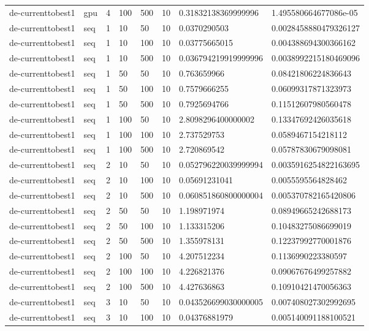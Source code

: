 \begin{table}[t]
\begin{tabular}{llllllll}
de-currenttobest1 & gpu & 4 & 100 & 500 & 10 & 0.31832138369999996 & 1.495580664677086e-05 \\
de-currenttobest1 & seq & 1 & 10 & 50 & 10 & 0.0370290503 & 0.0028458880479326127 \\
de-currenttobest1 & seq & 1 & 10 & 100 & 10 & 0.03775665015 & 0.004388694300366162 \\
de-currenttobest1 & seq & 1 & 10 & 500 & 10 & 0.036794219919999996 & 0.0038992215180469096 \\
de-currenttobest1 & seq & 1 & 50 & 50 & 10 & 0.763659966 & 0.08421806224836643 \\
de-currenttobest1 & seq & 1 & 50 & 100 & 10 & 0.7579666255 & 0.06099317871323973 \\
de-currenttobest1 & seq & 1 & 50 & 500 & 10 & 0.7925694766 & 0.11512607980560478 \\
de-currenttobest1 & seq & 1 & 100 & 50 & 10 & 2.8098296400000002 & 0.13347692426035618 \\
de-currenttobest1 & seq & 1 & 100 & 100 & 10 & 2.737529753 & 0.0589467154218112 \\
de-currenttobest1 & seq & 1 & 100 & 500 & 10 & 2.720869542 & 0.05787830679098081 \\
de-currenttobest1 & seq & 2 & 10 & 50 & 10 & 0.052796220039999994 & 0.0035916254822163695 \\
de-currenttobest1 & seq & 2 & 10 & 100 & 10 & 0.05691231041 & 0.0055595564828462 \\
de-currenttobest1 & seq & 2 & 10 & 500 & 10 & 0.060851860800000004 & 0.005370782165420806 \\
de-currenttobest1 & seq & 2 & 50 & 50 & 10 & 1.198971974 & 0.08949665242688173 \\
de-currenttobest1 & seq & 2 & 50 & 100 & 10 & 1.133315206 & 0.10483275086699019 \\
de-currenttobest1 & seq & 2 & 50 & 500 & 10 & 1.355978131 & 0.12237992770001876 \\
de-currenttobest1 & seq & 2 & 100 & 50 & 10 & 4.207512234 & 0.1136990223380597 \\
de-currenttobest1 & seq & 2 & 100 & 100 & 10 & 4.226821376 & 0.09067676499257882 \\
de-currenttobest1 & seq & 2 & 100 & 500 & 10 & 4.427636863 & 0.10910421470056363 \\
de-currenttobest1 & seq & 3 & 10 & 50 & 10 & 0.043526699030000005 & 0.007408027302992695 \\
de-currenttobest1 & seq & 3 & 10 & 100 & 10 & 0.04376881979 & 0.005140091188100521 \\

\end{tabular}
\end{table}
